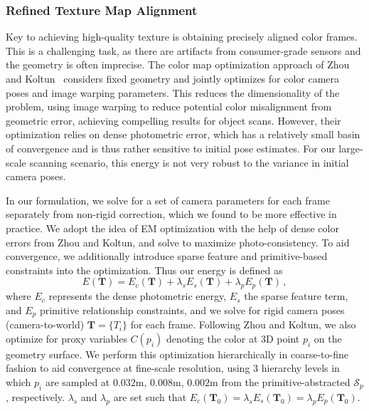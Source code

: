 \subsubsection{Refined Texture Map Alignment}
\label{subsec:3dlite-color-align}
Key to achieving high-quality texture is obtaining precisely aligned color frames.
This is a challenging task, as there are artifacts from consumer-grade sensors and the geometry is often imprecise.
The color map optimization approach of Zhou and Koltun~\cite{zhou2014color} considers fixed geometry and jointly optimizes for color camera poses and image warping parameters.
This reduces the dimensionality of the problem, using image warping to reduce potential color misalignment from geometric error, achieving compelling results for object scans.
However, their optimization relies on dense photometric error, which has a relatively small basin of convergence and is thus rather sensitive to initial pose estimates.
For our large-scale scanning scenario, this energy is not very robust to the variance in initial camera poses.

In our formulation, we solve for a set of camera parameters for each frame separately from non-rigid correction, which we found to be more effective in practice. 
We adopt the idea of EM optimization with the help of dense color errors from Zhou and Koltun, and solve to maximize photo-consistency.
To aid convergence, we additionally introduce sparse feature and primitive-based constraints into the optimization.
Thus our energy is defined as
$$ E(\mathbf{T})=E_c(\mathbf{T}) + \lambda_s E_s(\mathbf{T}) + \lambda_p E_p(\mathbf{T})\,, $$
where $E_c$ represents the dense photometric energy, $E_s$ the sparse feature term, and $E_p$ primitive relationship constraints, and we solve for rigid camera poses (camera-to-world) $\mathbf{T}=\{T_i\}$ for each frame.
Following Zhou and Koltun, we also optimize for proxy variables $C(p_i)$ denoting the color at 3D point $p_i$ on the geometry surface.
We perform this optimization hierarchically in coarse-to-fine fashion to aid convergence at fine-scale resolution, using 3 hierarchy levels in which $p_i$ are sampled at $0.032$m, $0.008$m, $0.002$m from the primitive-abstracted $\mathcal{S}_p$, respectively.
$\lambda_s$ and $\lambda_p$ are set such that $E_c(\mathbf{T}_0)=\lambda_s E_s(\mathbf{T}_0) = \lambda_p E_p(\mathbf{T}_0)$.

